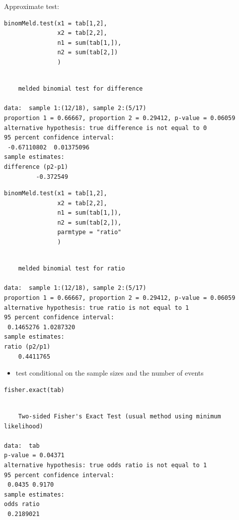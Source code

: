 \documentclass{article}
\begin{document}
Approximate test:
\lstset{language=r,label= ,caption= ,captionpos=b,numbers=none}
\begin{lstlisting}
binomMeld.test(x1 = tab[1,2],
               x2 = tab[2,2],
               n1 = sum(tab[1,]),
               n2 = sum(tab[2,])
               )
\end{lstlisting}

\begin{verbatim}

	melded binomial test for difference

data:  sample 1:(12/18), sample 2:(5/17)
proportion 1 = 0.66667, proportion 2 = 0.29412, p-value = 0.06059
alternative hypothesis: true difference is not equal to 0
95 percent confidence interval:
 -0.67110802  0.01375096
sample estimates:
difference (p2-p1) 
         -0.372549
\end{verbatim}

\lstset{language=r,label= ,caption= ,captionpos=b,numbers=none}
\begin{lstlisting}
binomMeld.test(x1 = tab[1,2],
               x2 = tab[2,2],
               n1 = sum(tab[1,]),
               n2 = sum(tab[2,]),
               parmtype = "ratio"
               )
\end{lstlisting}

\begin{verbatim}

	melded binomial test for ratio

data:  sample 1:(12/18), sample 2:(5/17)
proportion 1 = 0.66667, proportion 2 = 0.29412, p-value = 0.06059
alternative hypothesis: true ratio is not equal to 1
95 percent confidence interval:
 0.1465276 1.0287320
sample estimates:
ratio (p2/p1) 
    0.4411765
\end{verbatim}

\bigskip

\begin{itemize}
\item test conditional on the sample sizes and the number of events
\end{itemize}
\lstset{language=r,label= ,caption= ,captionpos=b,numbers=none}
\begin{lstlisting}
fisher.exact(tab)
\end{lstlisting}

\begin{verbatim}

	Two-sided Fisher's Exact Test (usual method using minimum likelihood)

data:  tab
p-value = 0.04371
alternative hypothesis: true odds ratio is not equal to 1
95 percent confidence interval:
 0.0435 0.9170
sample estimates:
odds ratio 
 0.2189021
\end{verbatim}
\end{document}
